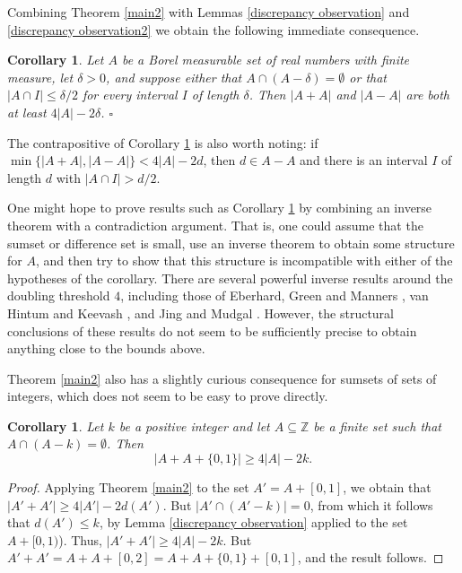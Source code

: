 \documentclass[11pt,reqno]{amsart}
\newtheorem{corollary}[theorem]{Corollary}
\theoremstyle{definition}
\def\Z{\mathbb{Z}}
\def\d{\delta}
\def\subset{\subseteq}
\begin{document}
Combining Theorem \ref{main2} with Lemmas \ref{discrepancy observation} and \ref{discrepancy observation2} we obtain the following immediate consequence.

\begin{corollary} \label{consequences}
Let $A$ be a Borel measurable set of real numbers with finite measure, let $\d>0$, and suppose either that $A\cap(A-\d)=\emptyset$ or that $|A\cap I|\leq\d/2$ for every interval $I$ of length $\d$. Then $|A+A|$ and $|A-A|$ are both at least $4|A|-2\d$. \hfill $\square$
\end{corollary}

The contrapositive of Corollary \ref{consequences} is also worth noting: if $\min\{|A+A|,|A-A|\}<4|A|-2d$, then $d\in A-A$ and there is an interval $I$ of length $d$ with $|A\cap I|>d/2$.

One might hope to prove results such as Corollary \ref{consequences} by combining an inverse theorem with a contradiction argument. That is, one could assume that the sumset or difference set is small, use an inverse theorem to obtain some structure for $A$, and then try to show that this structure is incompatible with either of the hypotheses of the corollary. There are several powerful inverse results around the doubling threshold $4$, including those of Eberhard, Green and Manners \cite{EberhardGreenManners2014}, van Hintum and Keevash \cite{vanHintumKeevash2026}, and Jing and Mudgal \cite{JingMudgal2026}. However, the structural conclusions of these results do not seem to be sufficiently precise to obtain anything close to the bounds above.

\medskip

Theorem \ref{main2} also has a slightly curious consequence for sumsets of sets of integers, which does not seem to be easy to prove directly. 

\begin{corollary}\label{discrete} Let $k$ be a positive integer and let $A\subset\Z$ be a finite set such that $A\cap(A-k)=\emptyset$. Then  \[|A+A+\{0,1\}|\geq 4|A|-2k.\] 
\end{corollary}

\begin{proof} Applying Theorem \ref{main2} to the set $A'=A+[0,1]$, we obtain that $|A'+A'|\geq 4|A'|-2d(A')$. But $|A'\cap(A'-k)|=0$, from which it follows that $d(A')\leq k$, by Lemma \ref{discrepancy observation} applied to the set $A+[0,1)$). Thus, $|A'+A'|\geq 4|A|-2k$. But $A'+A'=A+A+[0,2]=A+A+\{0,1\}+[0,1]$, and the result follows. 
\end{proof}
\end{document}
